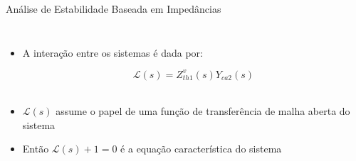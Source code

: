 \begin{frame}{Análise de Estabilidade Baseada em Impedâncias}
\begin{columns}
\centering

\begin{itemize}
	\item A interação entre os sistemas é dada por:
	
	\begin{equation*}
	\mathcal{L}(s) = Z_{th1}^v(s) Y_{ca2}(s)
	\end{equation*}\\[10pt]

	\item $\mathcal{L}(s)$ assume o papel de uma função de transferência de malha aberta do sistema\\[10pt]
	
	\item Então $\mathcal{L}(s) + 1 = 0$ é a equação característica do sistema  
\end{itemize}





\end{columns}

\end{frame}

%
%
%
%
%
%
%
%
%
%
%
%
%
%
%
%





